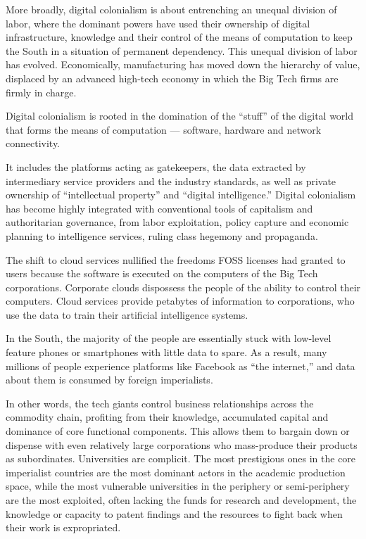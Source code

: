 \documentclass[
]{book}
\begin{document}
More broadly, digital colonialism is about entrenching an unequal division of labor, where the dominant powers have used their ownership of digital infrastructure, knowledge and their control of the means of computation to keep the South in a situation of permanent dependency. This unequal division of labor has evolved. Economically, manufacturing has moved down the hierarchy of value, displaced by an advanced high-tech economy in which the Big Tech firms are firmly in charge.

Digital colonialism is rooted in the domination of the ``stuff'' of the digital world that forms the means of computation --- software, hardware and network connectivity.

It includes the platforms acting as gatekeepers, the data extracted by intermediary service providers and the industry standards, as well as private ownership of ``intellectual property'' and ``digital intelligence.'' Digital colonialism has become highly integrated with conventional tools of capitalism and authoritarian governance, from labor exploitation, policy capture and economic planning to intelligence services, ruling class hegemony and propaganda.

The shift to cloud services nullified the freedoms FOSS licenses had granted to users because the software is executed on the computers of the Big Tech corporations. Corporate clouds dispossess the people of the ability to control their computers. Cloud services provide petabytes of information to corporations, who use the data to train their artificial intelligence systems.

In the South, the majority of the people are essentially stuck with low-level feature phones or smartphones with little data to spare. As a result, many millions of people experience platforms like Facebook as ``the internet,'' and data about them is consumed by foreign imperialists.

In other words, the tech giants control business relationships across the commodity chain, profiting from their knowledge, accumulated capital and dominance of core functional components. This allows them to bargain down or dispense with even relatively large corporations who mass-produce their products as subordinates. Universities are complicit. The most prestigious ones in the core imperialist countries are the most dominant actors in the academic production space, while the most vulnerable universities in the periphery or semi-periphery are the most exploited, often lacking the funds for research and development, the knowledge or capacity to patent findings and the resources to fight back when their work is expropriated.
\end{document}
